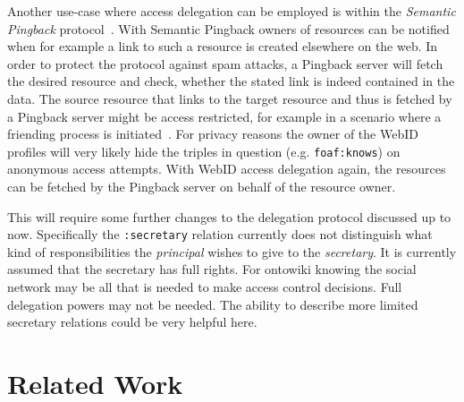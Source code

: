 \documentclass[a4paper]{llncs}
\begin{document}
Another use-case where access delegation can be employed is within the \textit{Semantic Pingback} protocol~\cite{tramp-s-2010--b}.
With Semantic Pingback owners of resources can be notified when for example a link to such a resource is created elsewhere on the web.
In order to protect the protocol against spam attacks, a Pingback server will fetch the desired resource and check, whether the stated link is indeed contained in the data.
The source resource that links to the target resource and thus is fetched by a Pingback server might be access restricted, for example in a scenario where a friending process is initiated~\cite{story-h-2011--a}.
For privacy reasons the owner of the WebID profiles will very likely hide the triples in question (e.g. \texttt{foaf:knows}) on anonymous access attempts.
With WebID access delegation again, the resources can be fetched by the Pingback server on behalf of the resource owner.

This will require some further changes to the delegation protocol discussed up to now. 
Specifically the \lstinline|:secretary| relation currently does not distinguish what kind of responsibilities the \textit{principal} wishes to give to the \textit{secretary}. 
It is currently assumed that the secretary has full rights. For ontowiki knowing the social network may be all that is needed to make access control decisions. 
Full delegation powers may not be needed. The ability to describe more limited secretary relations could be very helpful here.

\section{Related Work}\label{sec:relatedwork}

\end{document}
